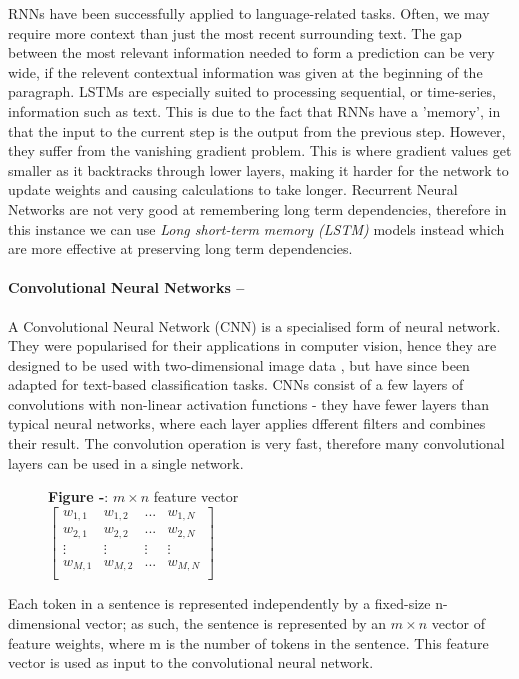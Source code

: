 \documentclass[12pt,a4paper]{article}
\begin{document}
RNNs have been successfully applied to language-related tasks. Often, we may require more context than just the most recent surrounding text. The gap between the most relevant information needed to form a prediction can be very wide, if the relevent contextual information was given at the beginning of the paragraph. LSTMs are especially suited to processing sequential, or time-series, information such as text. This is due to the fact that RNNs have a 'memory', in that the input to the current step is the output from the previous step. However, they suffer from the vanishing gradient problem. This is where gradient values get smaller as it backtracks through lower layers, making it harder for the network to update weights and causing calculations to take longer. Recurrent Neural Networks are not very good at remembering long term dependencies, therefore in this instance we can use \textit{Long short-term memory (LSTM)} models \cite{hochreiter1997long} instead which are more effective at preserving long term dependencies.



\paragraph{Convolutional Neural Networks --}
A Convolutional Neural Network (CNN)\cite{lecun1998gradient} is a specialised form of neural network. They were popularised for their applications in computer vision, hence they are designed to be used with two-dimensional image data \cite{krizhevsky2012imagenet}, but have since been adapted for text-based classification tasks. CNNs consist of a few layers of convolutions with non-linear activation functions - they have fewer layers than typical neural networks, where each layer applies dfferent filters and combines their result. The convolution operation is very fast, therefore many convolutional layers can be used in a single network.

\begin{minipage}{0.35\textwidth}
	\begin{figure}[H]
		\begin{center}
		\textbf{Figure -}: $m \times n$ feature vector\\
		$
		\begin{bmatrix}
		w_{1,1} & w_{1,2} & ... & w_{1,N}\\
		w_{2, 1} & w_{2, 2} & ... & w_{2, N} \\
		\vdots & \vdots & \vdots & \vdots \\
		w_{M, 1} & w_{M, 2} & ... & w_{M, N} \\
		\end{bmatrix}
		$
	\end{center}
	\end{figure}
\end{minipage} \hfill
\begin{minipage}{0.6\textwidth}
	Each token in a sentence is represented independently by a fixed-size n-dimensional vector; as such, the sentence is represented by an $m \times n$ vector of feature weights, where m is the number of tokens in the sentence. This feature vector is used as input to the convolutional neural network. 
\end{minipage}
\end{document}
